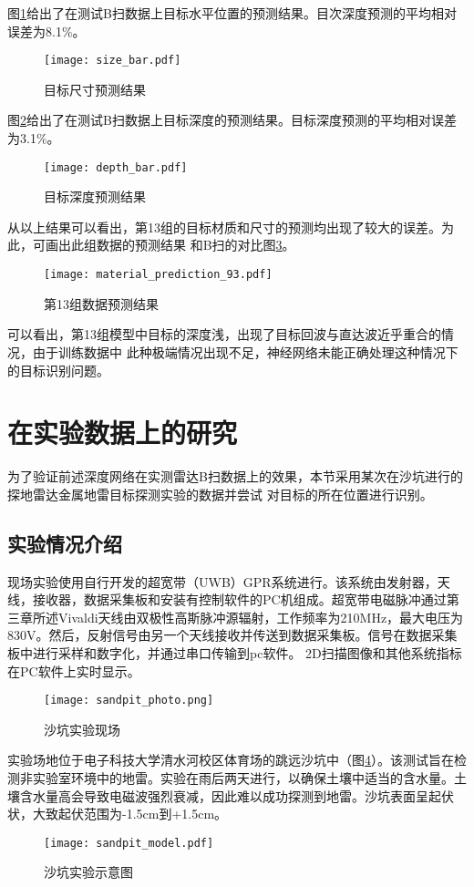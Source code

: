 图\ref{size_bar}给出了在测试B扫数据上目标水平位置的预测结果。目次深度预测的平均相对误差为8.1\%。
\begin{figure}[htbp]
	\texttt{[image: size\_bar.pdf]}
	\caption[]{目标尺寸预测结果}
	\label{size_bar}
\end{figure}

图\ref{depth_bar}给出了在测试B扫数据上目标深度的预测结果。目标深度预测的平均相对误差为3.1\%。
\begin{figure}[H]
	\texttt{[image: depth\_bar.pdf]}
	\caption[]{目标深度预测结果}
	\label{depth_bar}
\end{figure}

从以上结果可以看出，第13组的目标材质和尺寸的预测均出现了较大的误差。为此，可画出此组数据的预测结果
和B扫的对比图\ref{group13}。
\begin{figure}[H]
	\texttt{[image: material\_prediction\_93.pdf]}
	\caption[]{第13组数据预测结果}
	\label{group13}
\end{figure}

可以看出，第13组模型中目标的深度浅，出现了目标回波与直达波近乎重合的情况，由于训练数据中
此种极端情况出现不足，神经网络未能正确处理这种情况下的目标识别问题。

\section{在实验数据上的研究}
为了验证前述深度网络在实测雷达B扫数据上的效果，本节采用某次在沙坑进行的探地雷达金属地雷目标探测实验的数据并尝试
对目标的所在位置进行识别。
\subsection{实验情况介绍}
现场实验使用自行开发的超宽带（UWB）GPR系统进行。该系统由发射器，天线，接收器，数据采集板和安装有控制软件的PC机组成。超宽带电磁脉冲通过第三章所述Vivaldi天线由双极性高斯脉冲源辐射，工作频率为210MHz，最大电压为830V。然后，反射信号由另一个天线接收并传送到数据采集板。信号在数据采集板中进行采样和数字化，并通过串口传输到pc软件。 2D扫描图像和其他系统指标在PC软件上实时显示。
\begin{figure}[htbp]
	\texttt{[image: sandpit\_photo.png]}
	\caption[]{沙坑实验现场}
	\label{sandpit_photo}
\end{figure}

实验场地位于电子科技大学清水河校区体育场的跳远沙坑中（图\ref{sandpit_photo}）。该测试旨在检测非实验室环境中的地雷。实验在雨后两天进行，以确保土壤中适当的含水量。土壤含水量高会导致电磁波强烈衰减，因此难以成功探测到地雷。沙坑表面呈起伏状，大致起伏范围为-1.5cm到+1.5cm。
\begin{figure}[htbp]
	\texttt{[image: sandpit\_model.pdf]}
	\caption[]{沙坑实验示意图}
	\label{sandpit_model}
\end{figure}

